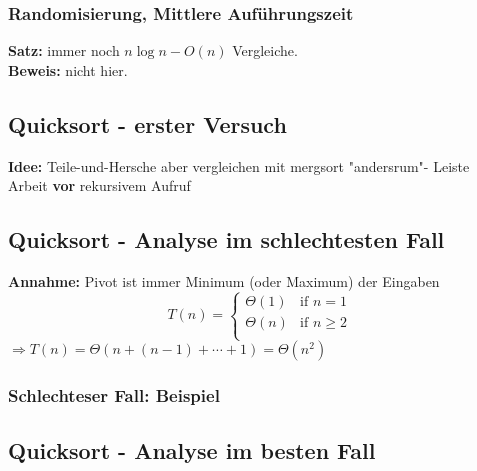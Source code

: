   \subsubsection*{Randomisierung, Mittlere Auführungszeit}
  
  \textbf{Satz:} immer noch $n \log n - O(n)$ Vergleiche. \\ \textbf{Beweis:} nicht hier.

  \subsection*{Quicksort - erster Versuch}
  \textbf{Idee:} Teile-und-Hersche aber vergleichen mit mergsort "andersrum"- Leiste Arbeit \textbf{vor} rekursivem Aufruf
    

  \subsection*{Quicksort - Analyse im
  schlechtesten Fall}

  \textbf{Annahme: }Pivot ist immer Minimum (oder Maximum) der Eingaben\[ T(n) = 
    \begin{cases}
        \Theta (1) & \text{if } n = 1 \\
        \Theta (n) & \text{if } n \geq 2 \\
    \end{cases} \] $\Rightarrow T (n) = \Theta (n + (n - 1) + \cdots + 1) = \Theta(n^2)$

    \subsubsection*{Schlechteser Fall: Beispiel}

    \subsection*{Quicksort - Analyse im besten Fall}
